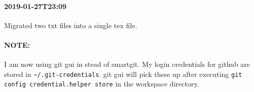 \documentclass[11pt, a4paper]{article}
\begin{document}
\paragraph{2019-01-27T23:09}
Migrated two txt files into a single tex file.

\paragraph{NOTE:}
I am now using git gui in stead of smartgit.
My login credentials for github are stored in \verb|~/.git-credentials|.
git gui will pick these up after executing \verb|git config credential.helper store| in the workspace directory.
\end{document}
